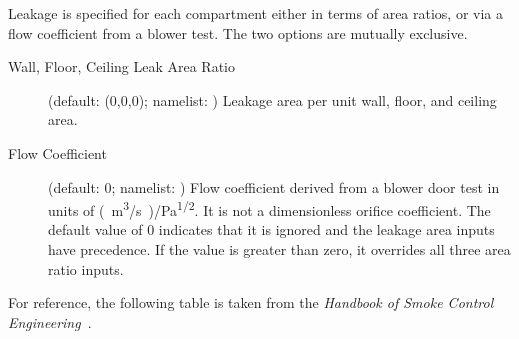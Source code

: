 Leakage is specified for each compartment either in terms of area ratios, or via a flow coefficient from a blower test. The two options are mutually exclusive.
\begin{description}
\item[Wall, Floor, Ceiling Leak Area Ratio] (default: (0,0,0); namelist: ) Leakage area per unit wall, floor, and ceiling area.
\item[Flow Coefficient] (default: 0; namelist: ) Flow coefficient derived from a blower door test in units of \unit{(m^3/s)/Pa^{1/2}}. It is not a dimensionless orifice coefficient. The default value of 0 indicates that it is ignored and the leakage area inputs have precedence. If the value is greater than zero, it overrides all three area ratio inputs.
\end{description}
For reference, the following table is taken from the \textit{Handbook of Smoke Control Engineering}~\cite{Klote:2012}.
